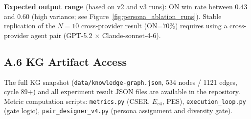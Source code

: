 \documentclass[12pt]{article}
\begin{document}
\noindent\textbf{Expected output range} (based on v2 and v3 runs):
ON win rate between 0.43 and 0.60 (high variance; see Figure~\ref{fig:persona_ablation_runs}).
Stable replication of the $N=10$ cross-provider result (ON=70\%) requires
using a cross-provider agent pair (GPT-5.2 $\times$ Claude-sonnet-4-6).

\subsection*{A.6 KG Artifact Access}

The full KG snapshot (\texttt{data/knowledge-graph.json}, 534 nodes / 1121 edges,
cycle 89+) and all experiment result JSON files are available in the repository.
Metric computation scripts: \texttt{metrics.py} (CSER, $E_{v4}$, PES),
\texttt{execution\_loop.py} (gate logic),
\texttt{pair\_designer\_v4.py} (persona assignment and diversity gate).
\end{document}
